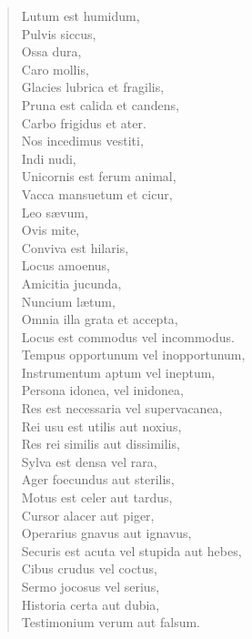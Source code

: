 \begin{verse}

  Lutum est humidum,\\
  Pulvis siccus,\\
  Ossa dura,\\
  Caro mollis,\\
  Glacies lubrica et fragilis,\\
  Pruna est calida et candens,\\
  Carbo frigidus et ater.\\
  Nos incedimus vestiti,\\
  Indi nudi,\\
  Unicornis est ferum animal,\\
  Vacca mansuetum et cicur,\\
  Leo sævum,\\
  Ovis mite,\\
  Conviva est hilaris,\\
  Locus amoenus,\\
  Amicitia jucunda,\\
  Nuncium lætum,\\
  Omnia illa grata et accepta,\\
  Locus est commodus vel incommodus.\\
  Tempus opportunum vel inopportunum,\\
  Instrumentum aptum vel ineptum,\\
  Persona idonea, vel inidonea,\\
  Res est necessaria vel supervacanea,\\
  Rei usu est utilis aut noxius,\\
  Res rei similis aut dissimilis,\\
  Sylva est densa vel rara,\\
  Ager foecundus aut sterilis,\\
  Motus est celer aut tardus,\\
  Cursor alacer aut piger,\\
  Operarius gnavus aut ignavus,\\
  Securis est acuta vel stupida aut hebes,\\
  Cibus crudus vel coctus,\\
  Sermo jocosus vel serius,\\
  Historia certa aut dubia,\\
  Testimonium verum aut falsum.\\
\end{verse}



